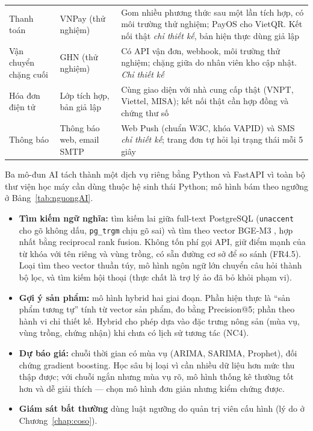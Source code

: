 \begin{longtable}{L{2.90cm} L{3.40cm} L{8.95cm}}
Thanh toán & VNPay (thử nghiệm) & Gom nhiều phương thức sau một lần tích hợp, có môi trường thử nghiệm; PayOS cho VietQR. Kết nối thật \emph{chỉ thiết kế}, bản hiện thực dùng giả lập \\
Vận chuyển chặng cuối & GHN (thử nghiệm) & Có API vận đơn, webhook, môi trường thử nghiệm; chặng giữa do nhân viên kho cập nhật. \emph{Chỉ thiết kế} \\
Hóa đơn điện tử & Lớp tích hợp, bản giả lập & Cùng giao diện với nhà cung cấp thật (VNPT, Viettel, MISA); kết nối thật cần hợp đồng và chứng thư số \\
Thông báo & Thông báo web, email SMTP & Web Push (chuẩn W3C, khóa VAPID) và SMS \emph{chỉ thiết kế}; trang đơn tự hỏi lại trạng thái mỗi 5 giây \\
\end{longtable}
\endgroup

Ba mô-đun AI tách thành một dịch vụ riêng bằng Python và FastAPI vì toàn bộ thư viện học máy cần dùng thuộc hệ sinh thái Python; mô hình bám theo ngưỡng ở Bảng~\ref{tab:nguongAI}.
\begin{itemize}
    \item \textbf{Tìm kiếm ngữ nghĩa:} tìm kiếm lai giữa full-text PostgreSQL (\texttt{unaccent} cho gõ không dấu, \texttt{pg\_trgm} chịu gõ sai) và tìm theo vector BGE-M3 \parencite{chen2024bgem3}, hợp nhất bằng reciprocal rank fusion. Không tốn phí gọi API, giữ điểm mạnh của từ khóa với tên riêng và vùng trồng, có sẵn đường cơ sở để so sánh (FR4.5). Loại tìm theo vector thuần túy, mô hình ngôn ngữ lớn chuyển câu hỏi thành bộ lọc, và tìm kiếm hội thoại (thực chất là trợ lý ảo đã bỏ khỏi phạm vi).
    \item \textbf{Gợi ý sản phẩm:} mô hình hybrid hai giai đoạn. Phần hiện thực là ``sản phẩm tương tự'' tính từ vector sản phẩm, đo bằng Precision@5; phần theo hành vi chỉ thiết kế. Hybrid cho phép dựa vào đặc trưng nông sản (mùa vụ, vùng trồng, chứng nhận) khi chưa có lịch sử tương tác (NC4).
    \item \textbf{Dự báo giá:} chuỗi thời gian có mùa vụ (ARIMA, SARIMA, Prophet), đối chứng gradient boosting. Học sâu bị loại vì cần nhiều dữ liệu hơn mức thu thập được; với chuỗi ngắn nhưng mùa vụ rõ, mô hình thống kê thường tốt hơn và dễ giải thích --- chọn mô hình đơn giản nhưng kiểm chứng được.
    \item \textbf{Giám sát bất thường} dùng luật ngưỡng do quản trị viên cấu hình (lý do ở Chương~\ref{chap:coso}).
\end{itemize}


